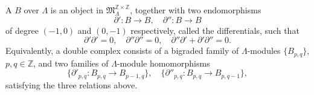 A  $B$ over $\Lambda$ is an object in $\mathfrak{M}_{\Lambda}^{\mathbb{Z} \times \mathbb{Z}}$, together with two endomorphisms
$$\partial' : B \rightarrow B, \quad \partial'' : B \rightarrow B$$
of degree $(-1, 0)$ and $(0, -1)$ respectively, called the differentials, such that
$$\partial' \partial' = 0, \quad \partial'' \partial'' = 0, \quad \partial'' \partial' + \partial' \partial'' = 0.$$
Equivalently, a double complex consists of a bigraded family of $\Lambda$-modules $\{B_{p,q}\}$, $p, q \in \mathbb{Z}$, and two families of $\Lambda$-module homomorphisms
$$\{\partial'_{p,q} : B_{p,q} \rightarrow B_{p-1,q}\}, \quad \{\partial''_{p,q} : B_{p,q} \rightarrow B_{p,q-1}\},$$
satisfying the three relations above.
